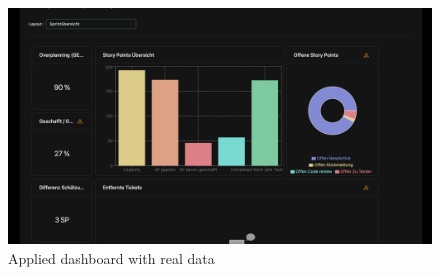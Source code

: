 \begin{figure}
    \centering
    \includegraphics[width=1\linewidth]{Figures/DashboardApplication.png}
    \caption{Applied dashboard with real data}
    \label{fig:appl-dashboard}
\end{figure}

